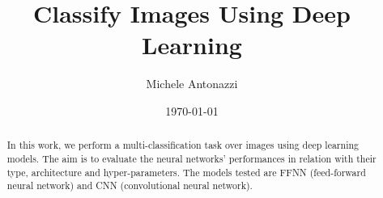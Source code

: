 \documentclass[letterpaper,12pt]{article}
\begin{document}
\title{Classify Images Using Deep Learning}
\author{Michele Antonazzi}
\date{\today}
\maketitle

\begin{abstract}
In this work, we perform a multi-classification task over images using deep learning models. The aim is to evaluate the neural networks' performances in relation with their type, architecture and hyper-parameters. The models tested are FFNN (feed-forward neural network) and CNN (convolutional neural network). 
\end{abstract}


\newpage

\newpage



\end{document}
